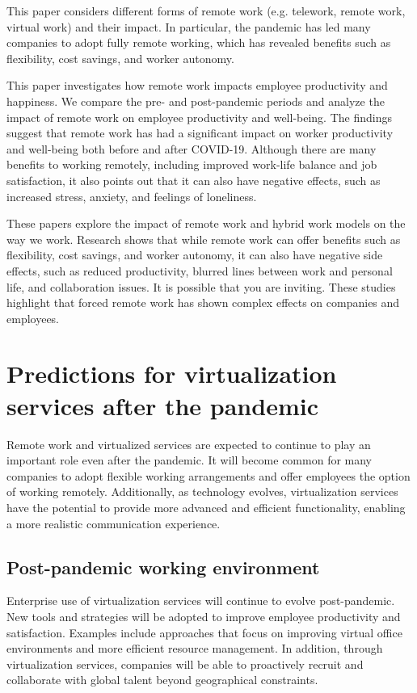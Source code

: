 \documentclass[12pt]{article}
\begin{document}
This paper \cite{ref12} considers different forms of remote work (e.g.
telework, remote work, virtual
work) and their impact. In particular, the pandemic has led many companies to
adopt fully remote working, which has revealed benefits such as flexibility,
cost savings, and worker autonomy.

This paper \cite{ref13} investigates
how remote work impacts employee productivity and happiness. We compare the
pre- and post-pandemic periods and analyze the impact of remote work on
employee productivity and well-being. The findings suggest that remote work has
had a significant impact on worker productivity and well-being both before and
after COVID-19. Although there are many benefits to working remotely, including
improved work-life balance and job satisfaction, it also points out that it can
also have negative effects, such as increased stress, anxiety, and feelings of
loneliness.

These papers explore the impact of remote work and hybrid work models on the
way we work. Research shows that while remote work can offer benefits such as
flexibility, cost savings, and worker autonomy, it can also have negative side
effects, such as reduced productivity, blurred lines between work and personal
life, and collaboration issues. It is possible that you are inviting. These
studies highlight that forced remote work has shown complex effects on
companies and employees.

\section{Predictions for virtualization services after the pandemic}
Remote work and virtualized services are expected to continue to play an
important role even after the pandemic. It will become common for many
companies to adopt flexible working arrangements and offer employees the option
of working remotely. Additionally, as technology evolves, virtualization
services have the potential to provide more advanced and efficient
functionality, enabling a more realistic communication experience.

\subsection{Post-pandemic working environment}
Enterprise use of virtualization services will continue to evolve
post-pandemic. New tools and strategies will be adopted to improve employee
productivity and satisfaction. Examples include approaches that focus on
improving virtual office environments and more efficient resource management.
In addition, through virtualization services, companies will be able to
proactively recruit and collaborate with global talent beyond geographical
constraints.
\end{document}
